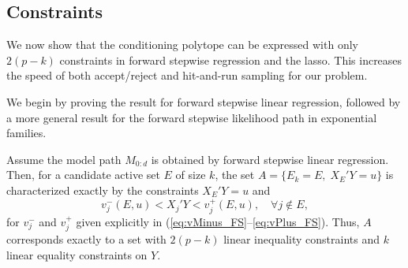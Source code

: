 \documentclass{article}
\begin{document}
\subsection{Constraints}\label{sec:constraints}
We now show that the conditioning polytope can be expressed with only $2(p-k)$ constraints in forward stepwise regression and the lasso. This increases the speed of both accept/reject and hit-and-run sampling for our problem.

We begin by proving the result for forward stepwise linear regression, followed by a more general result for the forward stepwise likelihood path in exponential families.

\begin{theorem}
  Assume the model path $M_{0:d}$ is obtained by forward stepwise 
  linear regression. Then, for a candidate active set $E$ of size $k$, 
  the set $A = \{E_k = E, \;X_E'Y = u\}$ is characterized 
  exactly by the constraints $X_E'Y=u$ and
  \[
  v_j^-(E,u) < X_j'Y < v_j^+(E,u), \quad\forall j \notin E,
  \]
  for $v_j^-$ and $v_j^+$ given explicitly in (\ref{eq:vMinus_FS}--\ref{eq:vPlus_FS}).  Thus, $A$ corresponds exactly to a set with $2(p-k)$ linear inequality constraints and $k$ linear equality constraints on $Y$.
\end{theorem}

\end{document}
